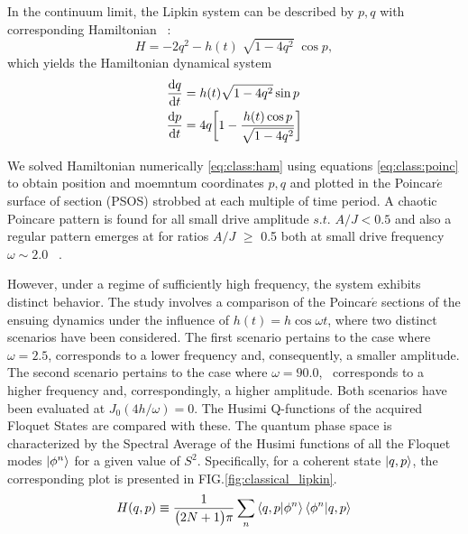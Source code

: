 \documentclass[%
reprint,
superscriptaddress,
amsmath,amssymb,
aps,
prb,
]{revtex4-2}
\begin{document}
	In the continuum limit, the Lipkin system can be described by $p,q$ with corresponding Hamiltonian ~\cite{sciolla_quantum_2010}:
	\begin{equation}
	H = -2 q^2 - h(t)\;\sqrt{1-4q^2}\;\cos{p},
	\label{eq:class:ham}
	\end{equation}
	which yields the Hamiltonian dynamical system 
	\begin{align}
		\dv{q}{t} &= h(t)\sqrt{1-4q^2}\sin{p}\nonumber \\
		\dv{p}{t} &= 4q\bigg[1-\frac{h(t)\cos{p}}{\sqrt{1-4q^2}}\bigg]
		\label{eq:class:poinc}
	\end{align}
	
	We solved Hamiltonian numerically \ref{eq:class:ham} using equations \ref{eq:class:poinc} to obtain position and moemntum coordinates $p,q$ and plotted in the Poincar$\acute{e}$ surface of section (PSOS) strobbed at each multiple of time period. A chaotic Poincare pattern is found for all small drive amplitude $s.t.$  $A/J < 0.5 $ and also a regular pattern emerges at for ratios $A/J$ $\geq$ 0.5 both at small drive frequency $\omega \sim 2.0$ ~\cite{russomanno_thermalization_2015}. 
	
	However, under a regime of sufficiently high frequency, the system exhibits distinct behavior. The study involves a comparison of the Poincar$\acute{e}$ sections of the ensuing dynamics under the influence of $h(t)=h\cos{\omega t}$, where two distinct scenarios have been considered. The first scenario pertains to the case where $\omega=2.5$, corresponds to a lower frequency and, consequently, a smaller amplitude. The second scenario pertains to the case where $\omega=90.0$,  corresponds to a higher frequency and, correspondingly, a higher amplitude. Both scenarios have been evaluated at $J_0(4h/\omega)=0$. The Husimi Q-functions of the acquired Floquet States are compared with these. The quantum phase space is characterized by the Spectral Average of the Husimi functions of all the Floquet modes $\ket{\phi^n}$ for a given value of $S^2$. Specifically, for a coherent state $\ket{q,p}$, the corresponding plot is presented in FIG.\ref{fig:classical_lipkin}.
	\begin{equation*}
		H(q,p)\equiv \frac{1}{\big(2N+1\big)\pi}\sum_n \ip{q,p}{\phi^n}\ip{\phi^n}{q,p}
	\end{equation*}
	
\end{document}
